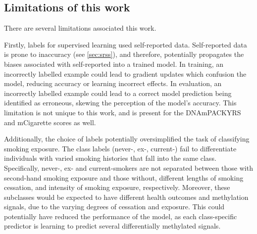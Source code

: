 \documentclass{article}
\begin{document}
\subsection{Limitations of this work} \label{sec:limitations}
There are several limitations associated this work. 

Firstly, labels for supervised learning used self-reported data. Self-reported data is prone to inaccuracy (see 
\ref{sec:srss}), and therefore, potentially propagates the biases associated with self-reported into a trained model. In training, an incorrectly labelled example could lead to gradient updates which confusion the model, reducing accuracy or learning incorrect effects. In evaluation, an incorrectly labelled example could lead to a correct model prediction being identified as erroneous, skewing the perception of the model's accuracy. This limitation is not unique to this work, and is present for the DNAmPACKYRS and mCigarette scores as well. 

Additionally, the choice of labels potentially oversimplified the task of classifying smoking exposure. The class labels (never-, ex-, current-) fail to differentiate individuals with varied smoking histories that fall into the same class. Specifically, never-, ex- and current-smokers are not separated between those with second-hand smoking exposure and those without, different lengths of smoking cessation, and intensity of smoking exposure, respectively. Moreover, these subclasses would be expected to have different health outcomes \cite{remen2018risk, flanders2003lung, lubin2006cigarette, doll1978cigarette} and methylation signals, due to the varying degrees of cessation and exposure. This could potentially have reduced the performance of the model, as each class-specific predictor is learning to predict several differentially methylated signals.
\end{document}
